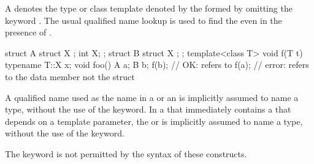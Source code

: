 \pnum
A 
denotes the type or class template
denoted by the 
formed by omitting the keyword .
The usual qualified name lookup is used to find the
even in the presence of
.
\begin{example}

\begin{codeblock}
struct A {
  struct X { };
  int X;
};
struct B {
  struct X { };
};
template<class T> void f(T t) {
  typename T::X x;
}
void foo() {
  A a;
  B b;
  f(b);             // OK:  refers to 
  f(a);             // error:  refers to the data member  not the struct 
}
\end{codeblock}
\end{example}

\pnum
A qualified name used as the name in a
or an
is implicitly assumed to name a type, without the use of the
keyword.
In a  that immediately contains a 
that depends on a template parameter, the  or 
is implicitly assumed to name a type, without the use of the  keyword.
\begin{note}
The
keyword is not permitted by the syntax of these constructs.
\end{note}

